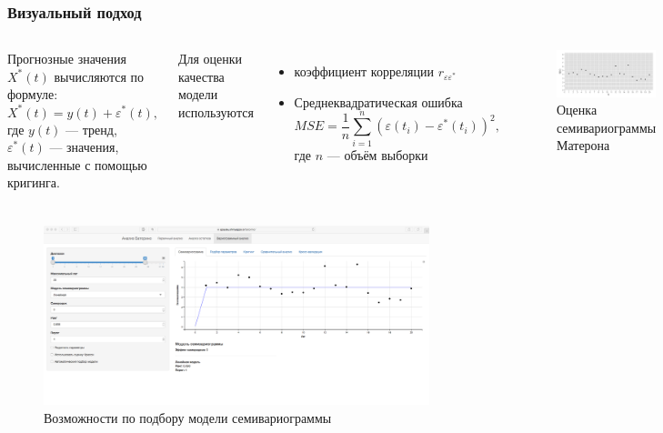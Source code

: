 \documentclass[notheorems]{beamer}
\theoremstyle{definition}
\theoremstyle{example}
\theoremstyle{plain}
\begin{document}
\begin{frame}
  \frametitle{Визуальный подход}
  \begin{columns}[c]
  \column{3in}
    Прогнозные значения $ X^{*}(t) $ вычисляются по формуле:
    \begin{equation*}
      X^{*}(t) = y(t) + \varepsilon^{*}(t),
    \end{equation*}
    где $ y(t) $ --- тренд, $ \varepsilon^{*}(t) $ --- значения, вычисленные с помощью кригинга.

    \vspace{0.5em}

    Для оценки качества модели используются
    \begin{itemize}
      \item коэффициент корреляции $ r_{\varepsilon\varepsilon^{*}} $
      \item Среднеквадратическая ошибка
        \begin{equation}
        \label{eq:mse}
          MSE = \frac{1}{n} \sum_{i=1}^{n} (\varepsilon(t_i) - \varepsilon^{*}(t_i))^2,
        \end{equation}
        где $ n $ --- объём выборки
    \end{itemize}

  \column{3in}
    \begin{figure}[h]
    \includegraphics[width=1\linewidth]{../../figures/variogram/lin-variogram.png}
    \caption{Оценка семивариограммы Матерона}
  \end{figure}
  \end{columns}
\end{frame}

\begin{frame}
  \frametitle{\large\secname}
  \framesubtitle{\subsecname}
    \begin{figure}[h]
    \includegraphics[width=1\textwidth]{../../figures/static/4_variogram.png}
    \caption{Возможности по подбору модели семивариограммы}
  \end{figure}
\end{frame}
\end{document}
